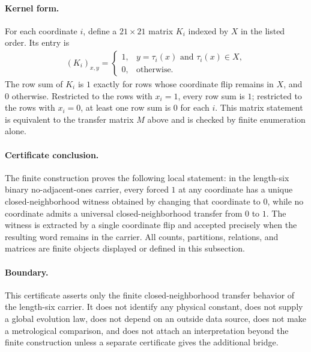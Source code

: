 \paragraph{Kernel form.}
For each coordinate $i$, define a $21\times 21$ matrix $K_i$ indexed by $X$ in the listed order.  Its entry is
$$
\begin{aligned}
(K_i)_{x,y}=\begin{cases}1,&y=\tau_i(x)\text{ and }\tau_i(x)\in X,\\0,&\text{otherwise.}\end{cases}
\end{aligned}
$$
The row sum of $K_i$ is $1$ exactly for rows whose coordinate flip remains in $X$, and $0$ otherwise.  Restricted to the rows with $x_i=1$, every row sum is $1$; restricted to the rows with $x_i=0$, at least one row sum is $0$ for each $i$.  This matrix statement is equivalent to the transfer matrix $M$ above and is checked by finite enumeration alone.

\paragraph{Certificate conclusion.}
The finite construction proves the following local statement: in the length-six binary no-adjacent-ones carrier, every forced $1$ at any coordinate has a unique closed-neighborhood witness obtained by changing that coordinate to $0$, while no coordinate admits a universal closed-neighborhood transfer from $0$ to $1$.  The witness is extracted by a single coordinate flip and accepted precisely when the resulting word remains in the carrier.  All counts, partitions, relations, and matrices are finite objects displayed or defined in this subsection.

\paragraph{Boundary.}
This certificate asserts only the finite closed-neighborhood transfer behavior of the length-six carrier.  It does not identify any physical constant, does not supply a global evolution law, does not depend on an outside data source, does not make a metrological comparison, and does not attach an interpretation beyond the finite construction unless a separate certificate gives the additional bridge.